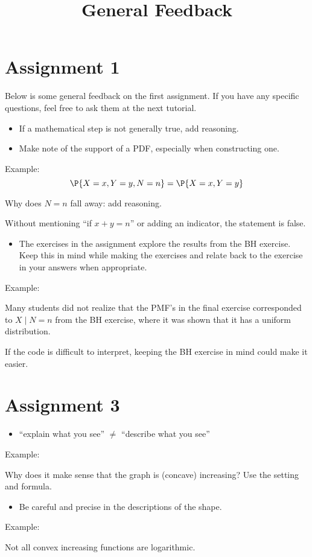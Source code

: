 


\title{General Feedback}


\maketitle

\section*{Assignment 1}
Below is some general feedback on the first assignment. If you have
any specific questions, feel free to ask them at the next tutorial.

\begin{itemize}
\item If a mathematical step is not generally true, add reasoning.
\item Make note of the support of a PDF, especially when constructing one.
\end{itemize}

Example:
$$\P{X=x, Y=y, N=n} = \P{X=x, Y=y}$$

Why does $N=n$ fall away: add reasoning.

Without mentioning ``if $x+y=n$'' or adding an indicator, the
statement is false.

\begin{itemize}
\item The exercises in the assignment explore the results from the BH
exercise. Keep this in mind while making the exercises and relate
back to the exercise in your answers when appropriate.
\end{itemize}

Example:

Many students did not realize that the PMF's in the final exercise
corresponded to $X\mid N=n$ from the BH exercise, where it was shown
that it has a uniform distribution.

If the code is difficult to interpret, keeping the BH exercise in
mind could make it easier.

\section*{Assignment 3}


\begin{itemize}
\item ``explain what you see'' $\neq $ ``describe what you see''
\end{itemize}

Example:

Why does it make sense that the graph is (concave) increasing? Use the
setting and formula.

\begin{itemize}
\item Be careful and precise in the descriptions of the shape.
\end{itemize}

Example:

Not all convex increasing functions are logarithmic.


